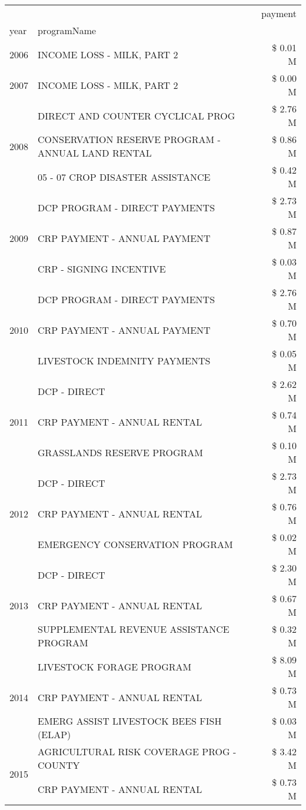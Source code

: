 \begin{tabular}{llr}
\toprule
 &  & payment \\
year & programName &  \\
\midrule
2006 & INCOME LOSS - MILK, PART 2 & \$ 0.01 M \\
\cline{1-3}
2007 & INCOME LOSS - MILK, PART 2 & \$ 0.00 M \\
\cline{1-3}
\multirow[t]{3}{*}{2008} & DIRECT AND COUNTER CYCLICAL PROG & \$ 2.76 M \\
 & CONSERVATION RESERVE PROGRAM - ANNUAL LAND RENTAL & \$ 0.86 M \\
 & 05 - 07 CROP DISASTER ASSISTANCE & \$ 0.42 M \\
\cline{1-3}
\multirow[t]{3}{*}{2009} & DCP PROGRAM - DIRECT PAYMENTS & \$ 2.73 M \\
 & CRP PAYMENT - ANNUAL PAYMENT & \$ 0.87 M \\
 & CRP - SIGNING INCENTIVE & \$ 0.03 M \\
\cline{1-3}
\multirow[t]{3}{*}{2010} & DCP PROGRAM - DIRECT PAYMENTS & \$ 2.76 M \\
 & CRP PAYMENT - ANNUAL PAYMENT & \$ 0.70 M \\
 & LIVESTOCK INDEMNITY PAYMENTS & \$ 0.05 M \\
\cline{1-3}
\multirow[t]{3}{*}{2011} & DCP - DIRECT & \$ 2.62 M \\
 & CRP PAYMENT - ANNUAL RENTAL & \$ 0.74 M \\
 & GRASSLANDS RESERVE PROGRAM & \$ 0.10 M \\
\cline{1-3}
\multirow[t]{3}{*}{2012} & DCP - DIRECT & \$ 2.73 M \\
 & CRP PAYMENT - ANNUAL RENTAL & \$ 0.76 M \\
 & EMERGENCY CONSERVATION PROGRAM & \$ 0.02 M \\
\cline{1-3}
\multirow[t]{3}{*}{2013} & DCP - DIRECT & \$ 2.30 M \\
 & CRP PAYMENT - ANNUAL RENTAL & \$ 0.67 M \\
 & SUPPLEMENTAL REVENUE ASSISTANCE PROGRAM & \$ 0.32 M \\
\cline{1-3}
\multirow[t]{3}{*}{2014} & LIVESTOCK FORAGE PROGRAM & \$ 8.09 M \\
 & CRP PAYMENT - ANNUAL RENTAL & \$ 0.73 M \\
 & EMERG ASSIST LIVESTOCK BEES FISH (ELAP) & \$ 0.03 M \\
\cline{1-3}
\multirow[t]{3}{*}{2015} & AGRICULTURAL RISK COVERAGE PROG - COUNTY & \$ 3.42 M \\
 & CRP PAYMENT - ANNUAL RENTAL & \$ 0.73 M \\

\end{tabular}
